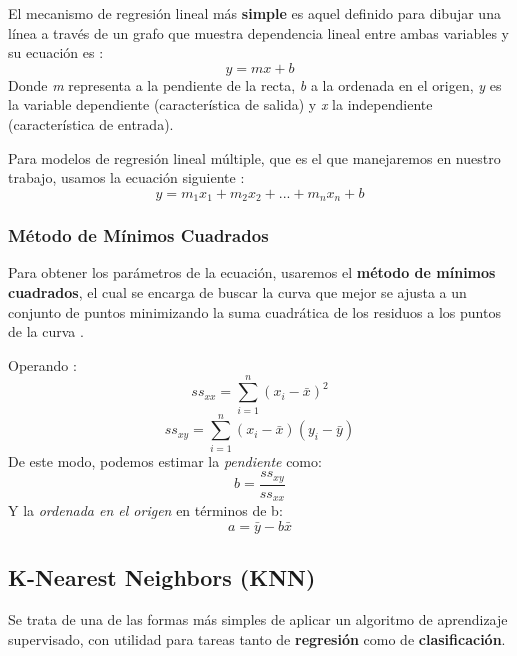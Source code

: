 El mecanismo de regresión lineal más \textbf{simple} es aquel definido para dibujar una línea a través de un grafo que muestra dependencia lineal entre ambas variables y su ecuación es \cite{Belyadi2021SupervisedLearning}:
\begin{equation}
    y=mx+b
\end{equation}
Donde \textit{m} representa a la pendiente de la recta, \textit{b} a la ordenada en el origen, \textit{y} es la variable dependiente (característica de salida) y \textit{x} la independiente (característica de entrada).

Para modelos de regresión lineal múltiple, que es el que manejaremos en nuestro trabajo, usamos la ecuación siguiente \cite{Belyadi2021SupervisedLearning}: 
\begin{equation}
    y = m_{1} x_{1} + m_{2} x_{2} + ... + m_{n}x_{n} + b
\end{equation}
\subsubsection{Método de Mínimos Cuadrados}
Para obtener los parámetros de la ecuación, usaremos el \textbf{método de mínimos cuadrados}, el cual se encarga de buscar la curva que mejor se ajusta a un conjunto de puntos minimizando la suma cuadrática de los residuos a los puntos de la curva \cite{WeissteinLeastFitting}.

Operando \cite{WeissteinLeastFitting}:
\begin{equation}
    ss_{xx} = \sum_{i=1}^{n}(x_{i}-\bar{x})^2
\end{equation}
\begin{equation}
        ss_{xy} = \sum_{i=1}^{n}(x_{i}-\bar{x})(y_{i}-\bar{y})
\end{equation}
De este modo, podemos estimar la \textit{pendiente} como:
\begin{equation}
    b = \frac{ss_{xy}}{ss_{xx}}
\end{equation}
Y la \textit{ordenada en el origen} en términos de b:
\begin{equation}
    a = \bar{y}-b\bar{x}
\end{equation}

\subsection{K-Nearest Neighbors (KNN)} 

Se trata de una de las formas más simples de aplicar un algoritmo de aprendizaje supervisado, con utilidad para tareas tanto de \textbf{regresión} como de \textbf{clasificación}.

